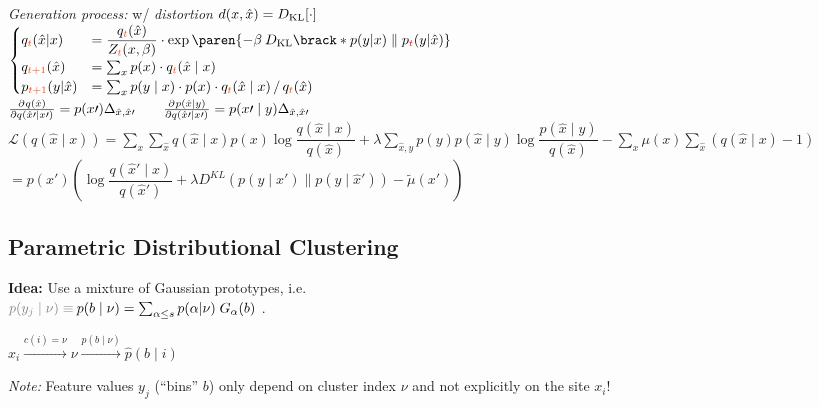 \emph{Generation process:}\enskip
w/ \textit{distortion} $d(x,\hat x) = D_\mathrm{KL}[\cdot]$\\
$\begin{cases}\begin{matrix*}[l]
    q_{\color{OrangeRed} t}(\hat x\vert x) &
        = \dfrac{q_{\color{OrangeRed} t}(\hat x)}{Z_{\color{OrangeRed} t}(x, \beta)} \cdot \exp\paren{ -\beta \: D\ped{KL}\brack*{p(y\vert x) \parallel p_{\color{red} t}(y\vert \hat x)} }
    \\
    q_{\color{OrangeRed} t{+}1}(\hat x) &
        = \sum_x p(x) \cdot q_{\color{OrangeRed} t}(\hat x \mid x)
    \\
    p_{\color{OrangeRed} t{+}1}(y\vert \hat x) &
        = \sum_{x} p(y\mid x) \cdot p(x) \cdot q_{\color{OrangeRed} t}(\hat x\mid x) \,/\, q_{\color{OrangeRed} t}(\hat x)
\end{matrix*}\end{cases}$\\
$\pderiv{q(\hat{x})}{q(\hat{x}\prime\mid x\prime)}= p(x\prime)\Delta_{\hat{x}, \hat{x}\prime} \qquad \pderiv{p(\hat{x}\mid y)}{q(\hat{x}\prime\mid x\prime)}=p(x\prime\mid y)\Delta_{\hat{x}, \hat{x}\prime}$\\
$\mathcal{L}(q(\hat{x}\mid x))=\sum_x\sum_{\hat{x}} q(\hat{x}\mid x)p(x)\log\dfrac{q(\hat{x}\mid x)}{q(\hat{x})}+\lambda\sum_{\hat{x}, y}p(y)p(\hat{x}\mid y)\log\dfrac{p(\hat{x}\mid y)}{q(\hat{x})} - \sum_x\mu(x)\sum_{\hat{x}}(q(\hat{x}\mid x) - 1)$\\
$=p(x\prime)\left(\log \dfrac{q(\hat{x}\prime\mid x)}{q(\hat{x}\prime)} + \lambda D^{KL}(p(y\mid x\prime)\| p(y\mid\hat{x}\prime))-\tilde{\mu}(x\prime)\right)$

\subsection{Parametric Distributional Clustering}

\textbf{Idea:} Use a mixture of Gaussian prototypes, i.e.\\  $\textcolor{gray}{p(y_j\mid\nu)\equiv\:} p(b\mid\nu) = \sum_{\alpha\leq s} p(\alpha\vert\nu) \; G_\alpha(b)$ .

\begin{minipage}{\linewidth}
    \centering
    $x_i \xrightarrow{c(i) = \nu} \nu \xrightarrow{p(b\mid\nu)} \hat p(b\mid i)$
\end{minipage}

\textit{Note:}\enspace
Feature values $y_j$ (``bins'' $b$) only depend on cluster index $\nu$ and not explicitly on the site $x_i$!

